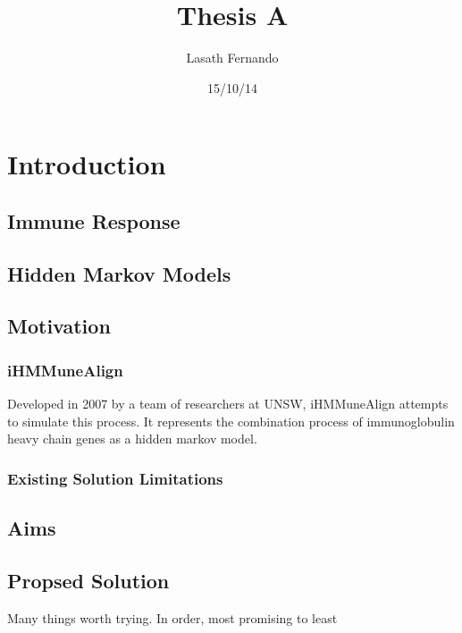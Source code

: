 \documentclass[a4paper,12pt]{report}
\author{Lasath Fernando}
\title{Thesis A}
\date{15/10/14}
\begin{document}
\maketitle


\chapter{Introduction}
\section{Immune Response}
\section{Hidden Markov Models}
\section{Motivation}
\subsection{iHMMuneAlign}
Developed in 2007 by a team of researchers at UNSW, iHMMuneAlign attempts to simulate this process.
It represents the combination process of immunoglobulin heavy chain genes as a hidden markov model.
\subsection{Existing Solution Limitations}
\section{Aims}
\section{Propsed Solution}
Many things worth trying. In order, most promising to least
\end{document}
